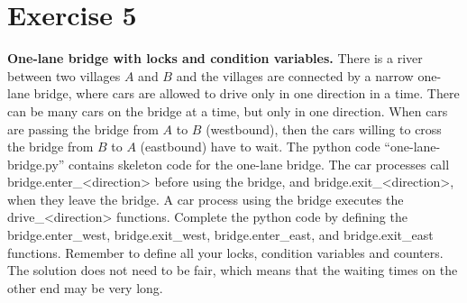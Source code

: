 \documentclass{article}
\newcommand{\exercise}[1]{
    \section*{Exercise #1}
    \markboth{Exercise #1}{}
}
\begin{document}
\exercise{5}
\textbf{One-lane bridge with locks and condition variables.}
There is a river between two villages \(A\) and \(B\) and
the villages are connected by a narrow one-lane bridge, 
where cars are allowed to drive only in one direction in a time.
There can be many cars on the bridge at a time, but only in 
one direction. When cars are passing the bridge from \(A\) to \(B\) 
(westbound), then the cars willing to cross the bridge from \(B\)
to \(A\) (eastbound) have to wait. The python code “one-lane-bridge.py”
contains skeleton code for the one-lane bridge. The car processes call
bridge.enter\_<direction> before using the bridge, and
bridge.exit\_<direction>, when they leave the bridge. A car 
process using the bridge executes the drive\_<direction> functions.
Complete the python code by defining the bridge.enter\_west,
bridge.exit\_west, bridge.enter\_east, and bridge.exit\_east functions.
Remember to define all your locks, condition variables and counters.
The solution does not need to be fair, which means that the waiting
times on the other end may be very long.\newline
\end{document}
